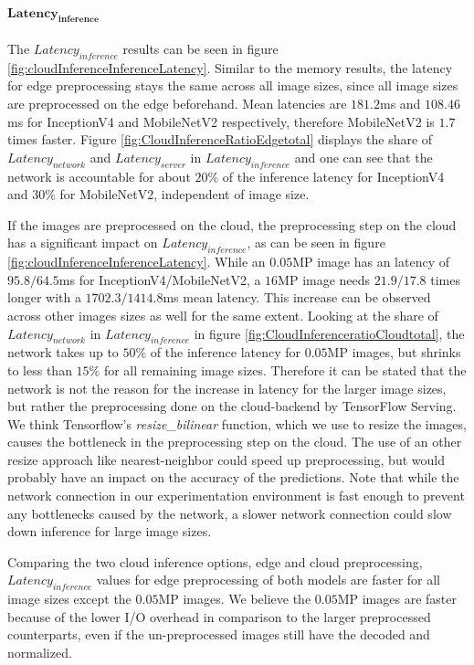 \paragraph{$\mathbf{Latency_{inference}}$}
The $Latency_{inference}$ results can be seen in figure \ref{fig:cloudInferenceInferenceLatency}.
Similar to the memory results, the latency for edge preprocessing stays the same across all image sizes, since all image sizes are preprocessed on the edge beforehand. 
Mean latencies are $181.2$ms and $108.46$ms for InceptionV4 and MobileNetV2 respectively, therefore MobileNetV2 is $1.7$ times faster.
Figure \ref{fig:CloudInferenceRatioEdgetotal} displays the share of $Latency_{network}$ and $Latency_{server}$ in $Latency_{inference}$ and one can see that the network is accountable for about $20\%$ of the  inference latency for InceptionV4 and $30\%$ for MobileNetV2, independent of image size.

If the images are preprocessed on the cloud, the preprocessing step on the cloud has a significant impact on $Latency_{inference}$, as can be seen in figure \ref{fig:cloudInferenceInferenceLatency}.
While an $0.05$MP image has an latency of $95.8/64.5$ms for InceptionV4/MobileNetV2, a $16$MP image needs $21.9/17.8$ times longer with a $1702.3/1414.8$ms mean latency.
This increase can be observed across other images sizes as well for the same extent. 
Looking at the share of $Latency_{network}$ in $Latency_{inference}$ in figure \ref{fig:CloudInferenceratioCloudtotal}, the network takes up to $50\%$ of the inference latency for $0.05$MP images, but shrinks to less than $15\%$ for all remaining image sizes.
Therefore it can be stated that the network is not the reason for the increase in latency for the larger image sizes, but rather the preprocessing done on the cloud-backend by TensorFlow Serving.
We think Tensorflow's \emph{resize\_bilinear} function, which we use to resize the images, causes the bottleneck in the preprocessing step on the cloud.
The use of an other resize approach like nearest-neighbor could speed up preprocessing, but would probably have an impact on the accuracy of the predictions.
Note that while the network connection in our experimentation environment is fast enough to prevent any bottlenecks caused by the network, a slower network connection could slow down inference for large image sizes.

Comparing the two cloud inference options, edge and cloud preprocessing,  $Latency_{inference}$ values for edge preprocessing of both models are faster for all image sizes except the $0.05$MP images.
We believe the $0.05$MP images are faster because of the lower I/O overhead in comparison to the larger preprocessed counterparts, even if the un-preprocessed images still have the decoded and normalized.

